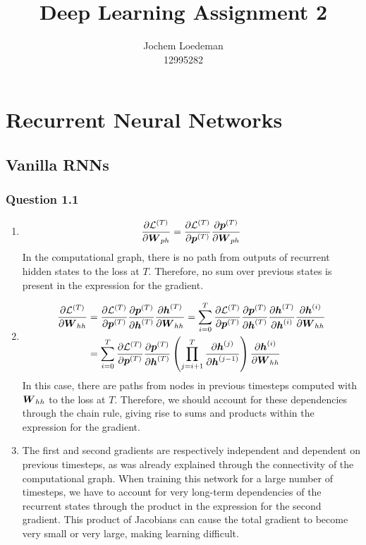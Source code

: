 \documentclass{article}
\title{Deep Learning Assignment 2}
\author{%
  Jochem Loedeman \\
  12995282
}
\newcommand{\pfrac}[2]{\frac{\partial #1}{\partial #2}}
\begin{document}
\maketitle
\section{Recurrent Neural Networks}
\subsection{Vanilla RNNs}
\subsubsection*{Question 1.1}
\begin{enumerate}[label=(\alph*)]
	\item
	$$\pfrac{\mathcal{L}^{(T)}}{\b W_{ph}} = \pfrac{\mathcal{L}^{(T)}}{\b p^{(T)}}\pfrac{\b p^{(T)}}{\b W_{ph}}$$ In the computational graph, there is no path from outputs of recurrent hidden states to the loss at $T$. Therefore, no sum over previous states is present in the expression for the gradient.
	\item
	$$
	\begin{aligned}
	\pfrac{\mathcal{L}^{(T)}}{\b W_{hh}} &= \pfrac{\mathcal{L}^{(T)}}{\b p^{(T)}}\pfrac{\b p^{(T)}}{\b h^{(T)}}\pfrac{\b h^{(T)}}{\b W_{hh}} = \sum_{i=0}^{T}\pfrac{\mathcal{L}^{(T)}}{\b p^{(T)}}\pfrac{\b p^{(T)}}{\b h^{(T)}}\pfrac{\b h^{(T)}}{\b h^{(i)}}\pfrac{\b h^{(i)}}{\b W_{hh}} \\ &= \sum_{i=0}^{T}\pfrac{\mathcal{L}^{(T)}}{\b p^{(T)}}\pfrac{\b p^{(T)}}{\b h^{(T)}}\left(\prod_{j=i+1}^T\pfrac{\b h^{(j)}}{\b h^{(j-1)}}\right)\pfrac{\b h^{(i)}}{\b W_{hh}}
	\end{aligned}
	$$ In this case, there are paths from nodes in previous timesteps computed with $\boldsymbol{W}_{hh}$ to the loss at $T$. Therefore, we should account for these dependencies through the chain rule, giving rise to sums and products within the expression for the gradient.
	\item The first and second gradients are respectively independent and dependent on previous timesteps, as was already explained through the connectivity of the computational graph. When training this network for a large number of timesteps, we have to account for very long-term dependencies of the recurrent states through the product in the expression for the second gradient. This product of Jacobians can cause the total gradient to become very small or very large, making learning difficult.
\end{enumerate}
\end{document}
